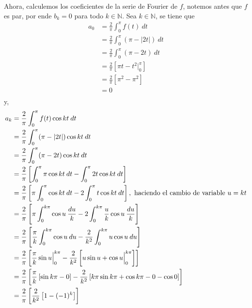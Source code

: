 \documentclass[12pt]{report}
\newcounter{it}
\theoremstyle{largebreak}
\newcommand\abs[1]{\ensuremath{\left|#1\right|}}
\begin{document}
\begin{sol}
        Ahora, calculemos los coeficientes de la serie de Fourier de $f$, notemos antes que $f$ es par, por ende $b_k=0$ para todo $k\in\mathbb{N}$. Sea $k\in\mathbb{N}$, se tiene que
        \begin{equation*}
            \begin{split}
                a_0&=\frac{2}{\pi}\int_{0}^{\pi}f(t)\:dt\\
                &=\frac{2}{\pi}\int_{0}^{\pi}(\pi-\abs{2t})\:dt\\
                &=\frac{2}{\pi}\int_{0}^{\pi}(\pi-2t)\:dt\\
                &=\frac{2}{\pi}\left[\pi t-t^2\Big|_0^\pi \right] \\
                &=\frac{2}{\pi}\left[\pi^2-\pi^2\right] \\
                &=0\\
            \end{split}
        \end{equation*}
        y,
        \begin{equation*}
            \begin{split}
                a_k&=\frac{2}{\pi}\int_{0}^{\pi}f(t)\cos kt\:dt\\
                &=\frac{2}{\pi}\int_{0}^{\pi}(\pi-\abs{2t})\cos kt\:dt\\
                &=\frac{2}{\pi}\int_{0}^{\pi}(\pi-2t)\cos kt\:dt\\
                &=\frac{2}{\pi}\left[\int_{0}^{\pi}\pi\cos kt\:dt-\int_{0}^{\pi}2t\cos kt\:dt\right]\\
                &=\frac{2}{\pi}\left[\pi\int_{0}^{\pi}\cos kt\:dt-2\int_{0}^{\pi}t\cos kt\:dt\right],\textup{ haciendo el cambio de variable }u=kt \\
                &=\frac{2}{\pi}\left[\pi\int_{0}^{k\pi}\cos u\:\frac{du}{k}-2\int_{0}^{k\pi}\frac{u}{k}\cos u\:\frac{du}{k} \right]\\
                &=\frac{2}{\pi}\left[\frac{\pi}{k}\int_{0}^{k\pi}\cos u\:du-\frac{2}{k^2}\int_{0}^{k\pi}u\cos u\:du\right]\\
                &=\frac{2}{\pi}\left[\frac{\pi}{k}\sin u\Big|_{0}^{k\pi} -\frac{2}{k^2}\left[u\sin u+\cos u\Big|_{0}^{k\pi}\right] \right]\\
                &=\frac{2}{\pi}\left[\frac{\pi}{k}\left[\sin k\pi-0 \right] -\frac{2}{k^2}\left[k\pi\sin k\pi+\cos k\pi-0-\cos0\right] \right]\\
                &=\frac{2}{\pi}\left[\frac{2}{k^2}\left[1-(-1)^k\right]\right]\\

\end{split}
\end{equation*}
\end{sol}
\end{document}
